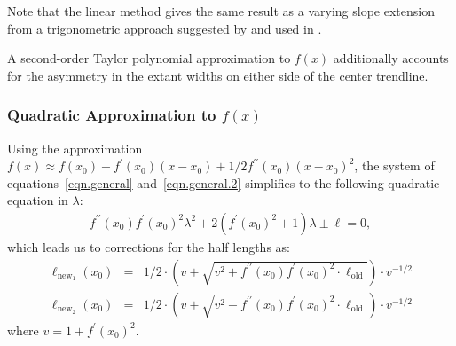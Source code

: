 \documentclass[11pt]{isuthesis}\usepackage[]{graphicx}\usepackage[]{color}
\begin{document}
Note that the linear method gives the same result as a varying slope extension from a trigonometric approach  suggested by \citet{schonlau:2003} and used in \citet{parallelsets}.

A second-order Taylor polynomial approximation to $f(x)$ additionally accounts for the asymmetry in the extant widths on either side of the center trendline.

\subsubsection{Quadratic Approximation to $f(x)$}\hfill\newline
Using the approximation $f(x) \approx f(x_0) + f^\prime(x_0)(x-x_0) + 1/2 f^{\prime\prime}(x_0)(x-x_0)^2$, the system of equations~\ref{eqn.general} and~\ref{eqn.general.2}  simplifies to the following  quadratic equation in $\lambda$:
\begin{eqnarray*}
f^{\prime\prime}(x_0)  f^\prime(x_0)^2 \lambda^2  + 2(f^\prime(x_0)^2 + 1) \lambda  \pm \ell = 0,
\end{eqnarray*}
which leads us to corrections for the half lengths as:
\begin{eqnarray}\label{eqn.q1}
\ell_{\text{new}_1}(x_0) &=& 1 /2 \cdot  \left(v + \sqrt{ v^2 +  f^{\prime\prime}(x_0) f^\prime(x_0)^2\cdot  \ell_{\text{old}}}\right) \cdot v^{-1/2} \\\label{eqn.q2}
\ell_{\text{new}_2}(x_0) &=& 1 /2 \cdot  \left(v + \sqrt{ v^2 -  f^{\prime\prime}(x_0) f^\prime(x_0)^2\cdot  \ell_{\text{old}}}\right) \cdot v^{-1/2} 
\end{eqnarray}
where $v = 1 + f^\prime(x_0)^2$.
\end{document}
